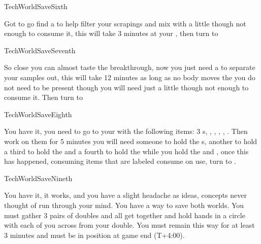 \documentclass[greennotebook]{guildcamp3} %
\begin{document}
\begin{page}{TechWorldSaveSixth}
	
	 Got to go find a  \iSieve{} to help filter your scrapings and mix with a little \iBloodPlasma{} though not enough to consume it, this will take 3 minutes at your \sTechWorkbench{}, then turn to  
	
\end{page}

\begin{page}{TechWorldSaveSeventh}
	
	So close you can almost taste the breakthrough, now you just need a \iCentrifuge{} to separate your samples out, this will take 12 minutes as long as no body moves the \iCentrifuge{} you do not need to be present though you will need just a little \iGraphiteLube{} though not enough to consume it. Then turn to  
	
\end{page}

\begin{page}{TechWorldSaveEighth}
	
	 You have it, you need to go to your \sTechWorkbench{} with the following items: 3 \iTFResistor{}s, \iScrapMetal{}, \iCog{}, \iCircuitBoard{}, \iFlashlight{}, \iMultitool{}. Then work on them for 5 minutes you will need someone to hold the \iTFResistor{}s, another to hold  \iScrapMetal{} a third to hold the \iCog{} and a fourth to hold the \iCircuitBoard{} while you hold the \iFlashlight{} and \iMultitool{}, once this has happened, consuming items that are labeled consume on use, turn to .
	
\end{page}

\begin{page}{TechWorldSaveNineth}
	
	You have it, it works, and you have a slight headache as ideas, concepts never thought of run through your mind. You have a way to save both worlds.  You must gather 3 pairs of doubles and all get together and hold hands in a circle with each of you across from your double. You must remain this way for at least 3 minutes and must be in position at game end (T+4:00).
	
\end{page}

\endnotebook
\end{document}
